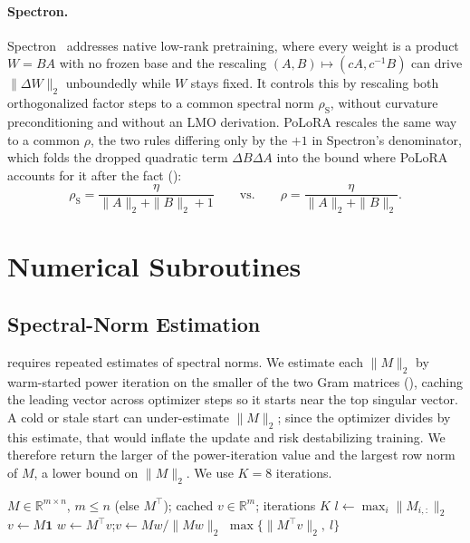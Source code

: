 \documentclass[11pt]{article}
\newcommand{\norm}[1]{\| #1\|}
\newcommand{\methodname}{PoLoRA\xspace}
\theoremstyle{plain}
\theoremstyle{definition}
\theoremstyle{remark}
\theoremstyle{definition}
\begin{document}
\paragraph{Spectron.}
Spectron~\cite{spectron} addresses native low-rank pretraining, where every weight is a
product $W=BA$ with no frozen base and the rescaling $(A,B)\mapsto(cA,c^{-1}B)$ can drive
$\norm{\Delta W}_2$ unboundedly while $W$ stays fixed. It controls this by rescaling both
orthogonalized factor steps to a common spectral norm $\rho_{\mathrm S}$, without curvature
preconditioning and without an LMO derivation. \methodname{} rescales the same way to a common
$\rho$, the two rules differing only by the $+1$ in Spectron's denominator, which folds the
dropped quadratic term $\Delta B\Delta A$ into the bound where \methodname{} accounts for it
after the fact ():
\[
  \rho_{\mathrm S}=\frac{\eta}{\norm{A}_2+\norm{B}_2+1}
  \qquad\text{vs.}\qquad
  \rho=\frac{\eta}{\norm{A}_2+\norm{B}_2}.
\]

\section{Numerical Subroutines}
\label{app:primitives}

\subsection{Spectral-Norm Estimation}
\label{app:smax}
 requires repeated estimates of spectral norms.  
We estimate each $\norm{M}_2$ by warm-started power iteration on the smaller of
the two Gram matrices (), caching the leading vector across
optimizer steps so it starts near the top singular vector.  A cold or stale start
can under-estimate $\norm{M}_2$; since the optimizer divides by this estimate,
that would inflate the update and risk destabilizing training.  We therefore
return the larger of the power-iteration value and the largest row norm of $M$, a
lower bound on $\norm{M}_2$.  We use $K=8$ iterations.

\begin{algorithm}[ht]
\caption{Guarded spectral-norm estimate of $\norm{M}_2$}
\label{alg:smax}
\begin{algorithmic}[1]
\Require $M\in\mathbb{R}^{m\times n}$, $m\le n$ (else $M^\top$); cached $v\in\mathbb{R}^m$; iterations $K$
\State $l \gets \max_i\norm{M_{i,:}}_2$
 \State $v\gets M\mathbf{1}$  \EndIf
{} 
  \State $w\gets M^\top v$;\quad $v\gets Mw/\norm{Mw}_2$
\EndFor
\State \Return $\max\big\{\norm{M^\top v}_2,\ l\big\}$
\end{algorithmic}
\end{algorithm}
\end{document}
